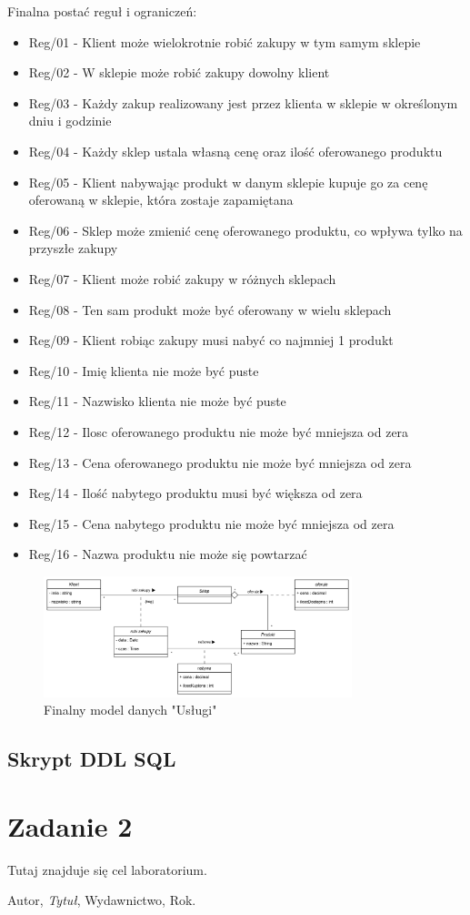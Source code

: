 \documentclass[a4paper,12pt]{article}
\begin{document}
Finalna postać reguł i ograniczeń:

\begin{itemize}
    \item Reg/01 - Klient może wielokrotnie robić zakupy w tym samym sklepie
    \item Reg/02 - W sklepie może robić zakupy dowolny klient
    \item Reg/03 - Każdy zakup realizowany jest przez klienta w sklepie w określonym dniu i godzinie
    \item Reg/04 - Każdy sklep ustala własną cenę oraz ilość oferowanego produktu 
    \item Reg/05 - Klient nabywając produkt w danym sklepie kupuje go za cenę oferowaną w sklepie, która zostaje zapamiętana
    \item Reg/06 - Sklep może zmienić cenę oferowanego produktu, co wpływa tylko na przyszłe zakupy
    \item Reg/07 - Klient może robić zakupy w różnych sklepach
    \item Reg/08 - Ten sam produkt może być oferowany w wielu sklepach
    \item Reg/09 - Klient robiąc zakupy musi nabyć co najmniej 1 produkt
    \item Reg/10 - Imię klienta nie może być puste
    \item Reg/11 - Nazwisko klienta nie może być puste
    \item Reg/12 - Ilosc oferowanego produktu nie może być mniejsza od zera
    \item Reg/13 - Cena oferowanego produktu nie może być mniejsza od zera
    \item Reg/14 - Ilość nabytego produktu musi być większa od zera
    \item Reg/15 - Cena nabytego produktu nie może być mniejsza od zera
    \item Reg/16 - Nazwa produktu nie może się powtarzać
\end{itemize}

\begin{figure}[H]
\centering
\includegraphics[width=0.8\textwidth]{images/improved.png}
\caption{Finalny model danych "Usługi"}
\label{fig:final_model}
\end{figure}

\subsection{Skrypt DDL SQL}

\section{Zadanie 2}
Tutaj znajduje się cel laboratorium.

\begin{thebibliography}{9}
Autor, \textit{Tytuł}, Wydawnictwo, Rok.
\end{thebibliography}
\end{document}
